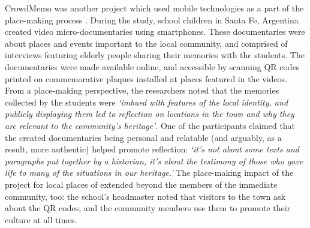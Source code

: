 CrowdMemo was another project which used mobile technologies as a part of the place-making process \citep{Balestrini2014}. During the study, school children in Santa Fe, Argentina created video micro-documentaries using smartphones. These documentaries were about places and events important to the local community, and comprised of interviews featuring elderly people sharing their memories with the students. The documentaries were made available online, and accessible by scanning QR codes printed on commemorative plaques installed at places featured in the videos. From a place-making perspective, the researchers noted that the memories collected by the students were \textit{`imbued with features of the local identity, and publicly displaying them led to reflection on locations in the town and why they are relevant to the community's heritage'}. One of the participants claimed that the created documentaries being personal and relatable (and arguably, as a result, more authentic) helped promote reflection: \textit{`it's not about some texts and paragraphs put together by a historian, it's about the testimony of those who gave life to many of the situations in our heritage.'} The place-making impact of the project for local places of extended beyond the members of the immediate community, too: the school's headmaster noted that visitors to the town ask about the QR codes, and the community members use them to promote their culture at all times. 

